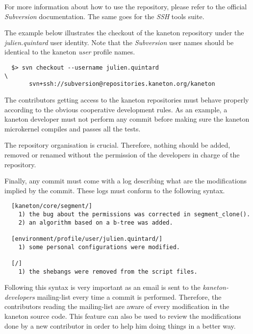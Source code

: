 For more information about how to use the repository, please refer to the
official \textit{Subversion} documentation. The same goes for the
\textit{SSH} tools suite.

The example below illustrates the checkout of the kaneton repository
under the \textit{julien.quintard} user identity. Note that the
\textit{Subversion} user names should be identical to the kaneton \textit{user}
profile names.

\begin{verbatim}
  $> svn checkout --username julien.quintard                            \
       svn+ssh://subversion@repositories.kaneton.org/kaneton
\end{verbatim}

The contributors getting access to the kaneton repositories must behave
properly according to the obvious cooperative development rules. As an
example, a kaneton developer must not perform any commit before making sure
the kaneton microkernel compiles and passes all the tests.

The repository organisation is crucial. Therefore, nothing should be
added, removed or renamed without the permission of the developers in charge
of the repository.

Finally, any commit must come with a log describing what are the modifications
implied by the commit. These logs must conform to the following syntax.

\begin{verbatim}
  [kaneton/core/segment/]
    1) the bug about the permissions was corrected in segment_clone().
    2) an algorithm based on a b-tree was added.

  [environment/profile/user/julien.quintard/]
    1) some personal configurations were modified.

  [/]
    1) the shebangs were removed from the script files.
\end{verbatim}

Following this syntax is very important as an email is sent to the
\textit{kaneton-developers} mailing-list every time a commit is performed.
Therefore, the contributors reading the mailing-list are aware of every
modification in the kaneton source code. This feature can also be used
to review the modifications done by a new contributor in order to help
him doing things in a better way.
